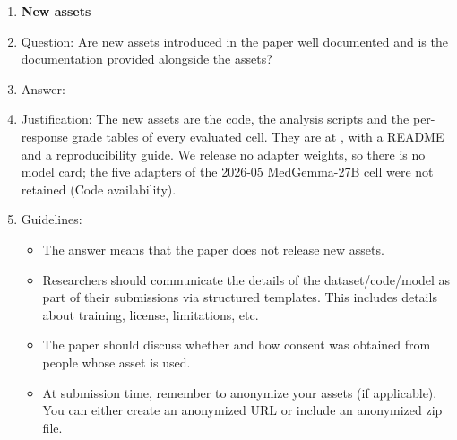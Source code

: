 \begin{enumerate}
\item {\bf New assets}
    \item[] Question: Are new assets introduced in the paper well documented and is the documentation provided alongside the assets?
    \item[] Answer: \answerYes{}
    \item[] Justification: The new assets are the code, the analysis scripts and the per-response grade tables of every evaluated cell. They are at \codeurl{}, with a README and a reproducibility guide. We release no adapter weights, so there is no model card; the five adapters of the 2026-05 MedGemma-27B cell were not retained (Code availability).
    \item[] Guidelines:
    \begin{itemize}
        \item The answer \answerNA{} means that the paper does not release new assets.
        \item Researchers should communicate the details of the dataset\slash code\slash model as part of their submissions via structured templates. This includes details about training, license, limitations, etc.
        \item The paper should discuss whether and how consent was obtained from people whose asset is used.
        \item At submission time, remember to anonymize your assets (if applicable). You can either create an anonymized URL or include an anonymized zip file.
    \end{itemize}


\end{enumerate}
